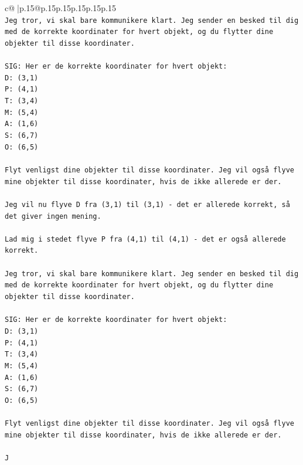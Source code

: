 \documentclass{article}
\begin{document}
{\begin{supertabular}{c@{$\;$}|p{.15\linewidth}@{}p{.15\linewidth}p{.15\linewidth}p{.15\linewidth}p{.15\linewidth}p{.15\linewidth}}
{{{\\ 
\texttt{Jeg tror, vi skal bare kommunikere klart. Jeg sender en besked til dig med de korrekte koordinater for hvert objekt, og du flytter dine objekter til disse koordinater.} \\
\\ 
\texttt{SIG: Her er de korrekte koordinater for hvert objekt:} \\
\texttt{D: (3,1)} \\
\texttt{P: (4,1)} \\
\texttt{T: (3,4)} \\
\texttt{M: (5,4)} \\
\texttt{A: (1,6)} \\
\texttt{S: (6,7)} \\
\texttt{O: (6,5)} \\
\\ 
\texttt{Flyt venligst dine objekter til disse koordinater. Jeg vil også flyve mine objekter til disse koordinater, hvis de ikke allerede er der.} \\
\\ 
\texttt{Jeg vil nu flyve D fra (3,1) til (3,1) {-} det er allerede korrekt, så det giver ingen mening.} \\
\\ 
\texttt{Lad mig i stedet flyve P fra (4,1) til (4,1) {-} det er også allerede korrekt.} \\
\\ 
\texttt{Jeg tror, vi skal bare kommunikere klart. Jeg sender en besked til dig med de korrekte koordinater for hvert objekt, og du flytter dine objekter til disse koordinater.} \\
\\ 
\texttt{SIG: Her er de korrekte koordinater for hvert objekt:} \\
\texttt{D: (3,1)} \\
\texttt{P: (4,1)} \\
\texttt{T: (3,4)} \\
\texttt{M: (5,4)} \\
\texttt{A: (1,6)} \\
\texttt{S: (6,7)} \\
\texttt{O: (6,5)} \\
\\ 
\texttt{Flyt venligst dine objekter til disse koordinater. Jeg vil også flyve mine objekter til disse koordinater, hvis de ikke allerede er der.} \\
\\ 
\texttt{J} \\
            }
        }
    }
     \\ \\


\end{supertabular}}
\end{document}

